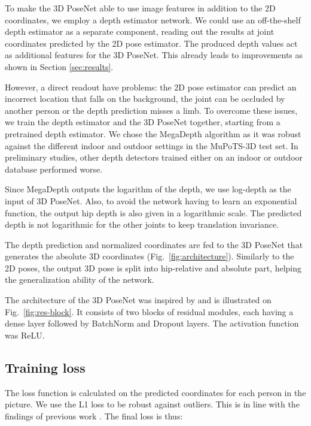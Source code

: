 \documentclass[conference]{IEEEtran}
\begin{document}
To make the 3D PoseNet able to use image features in addition to the 2D coordinates, we employ a depth estimator network. We could use an off-the-shelf depth estimator as a separate component, reading out the results at joint coordinates predicted by the 2D pose estimator.  The produced depth values act as additional features for the 3D PoseNet. This already leads to improvements as shown in Section \ref{sec:results}.

However, a direct readout have problems: the 2D pose estimator can predict an incorrect location that falls on the background, the joint can be occluded by another person or the depth prediction misses a limb. To overcome these issues, we train the depth estimator and the 3D PoseNet together, starting from a pretrained depth estimator. We chose the MegaDepth algorithm \cite{megadepth2018} as it was robust against the different indoor and outdoor settings in the MuPoTS-3D test set. In preliminary studies, other depth detectors trained  either on an indoor or outdoor database performed worse.

Since MegaDepth outputs the logarithm of the depth, we use log-depth as the input of 3D PoseNet. Also, to avoid the network having to learn an exponential function, the output hip depth is also given in a logarithmic scale. The predicted depth is not logarithmic for the other joints to keep translation invariance. 

The depth prediction and normalized coordinates are fed to the 3D PoseNet that generates the absolute 3D coordinates (Fig.~\ref{fig:architecture}). Similarly to the 2D poses, the output 3D pose is split into hip-relative and absolute part, helping the generalization ability of the network.

The architecture of the 3D PoseNet was inspired by \cite{3dbaseline} and is illustrated on Fig.~\ref{fig:res-block}. It consists of two blocks of residual modules, each having a dense layer followed by BatchNorm \cite{batchnorm} and Dropout \cite{dropout} layers. The activation function was ReLU.


\subsection{Training loss}
The loss function is calculated on the predicted coordinates for each person in the picture. We use the L1 loss to be robust against outliers. This is in line with the findings of previous work \cite{integralPose,sarandi2018eccv_winner}. The final loss is thus:
\end{document}
